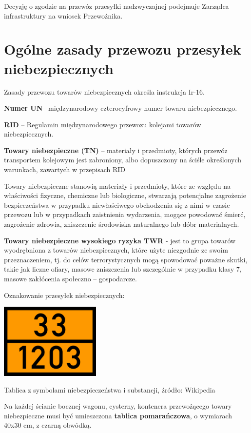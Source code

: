 Decyzję o zgodzie na przewóz przesyłki nadzwyczajnej podejmuje Zarządca infrastruktury na wniosek Przewoźnika.

\chapter{Ogólne zasady przewozu przesyłek niebezpiecznych}

Zasady przewozu towarów niebezpiecznych określa instrukcja Ir-16. 

\textbf{Numer UN}– międzynarodowy czterocyfrowy numer towaru niebezpiecznego.

\textbf{RID} – Regulamin międzynarodowego przewozu kolejami towarów niebezpiecznych.

\textbf{Towary niebezpieczne (TN)} – materiały i przedmioty, których przewóz transportem kolejowym jest zabroniony, albo
dopuszczony na ściśle określonych warunkach, zawartych w przepisach RID

Towary niebezpieczne stanowią materiały i przedmioty, które ze względu na właściwości fizyczne, chemiczne lub biologiczne, stwarzają potencjalne zagrożenie bezpieczeństwa w przypadku niewłaściwego obchodzenia się z nimi w czasie przewozu lub w przypadkach zaistnienia wydarzenia, mogące powodować śmierć, zagrożenie zdrowia, zniszczenie środowiska naturalnego lub dóbr materialnych.

\textbf{Towary niebezpieczne wysokiego ryzyka TWR} -  jest to grupa towarów wyodrębniona z towarów niebezpiecznych, które użyte niezgodnie ze swoim przeznaczeniem, tj. do celów terrorystycznych mogą spowodować poważne skutki, takie jak liczne ofiary, masowe zniszczenia lub szczególnie w przypadku klasy 7, masowe zakłócenia społeczno – gospodarcze.

Oznakowanie przesyłek niebezpiecznych:
\begin{marginfigure}
	\includegraphics[width=5cm]{skryptkierownik-img/tablica-adr.png}
	\caption{Tablica z symbolami niebezpieczeństwa i substancji, źródło: Wikipedia}
	\label{fig:adr}
\end{marginfigure}	
Na każdej ścianie bocznej wagonu, cysterny, kontenera przewożącego towary niebezpieczne musi być umieszczona \textbf{tablica pomarańczowa}, o wymiarach 40x30 cm, z czarną obwódką. 


